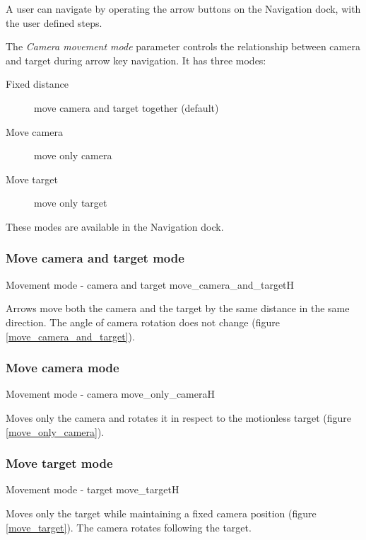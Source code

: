 A user can navigate by operating the arrow buttons on the Navigation dock, with the
user defined steps.

The \emph{Camera movement mode} parameter controls the relationship between camera and target during arrow key navigation. It has three modes:

\begin{description}
	\item[Fixed distance] move camera and target together (default)
	\item[Move camera] move only camera
	\item[Move target] move only target
\end{description}

These modes are available in the Navigation dock.

\subsubsection{Move camera and target mode}\label{move-camera-and-target-mode}

{Movement mode - camera and target}
{move_camera_and_target}{H}

Arrows move both the camera and the target by the same distance in the same direction. The angle of camera rotation does not change (figure \ref{move_camera_and_target}).

\subsubsection{Move camera mode}\label{move-camera-mode}

{Movement mode - camera}
{move_only_camera}{H}

Moves only the camera and rotates it in respect to the motionless target (figure \ref{move_only_camera}).

\subsubsection{Move target mode}\label{move-target-mode}

{Movement mode - target}
{move_target}{H}

Moves only the target while maintaining a fixed camera position (figure \ref{move_target}). The camera rotates following the target. 


